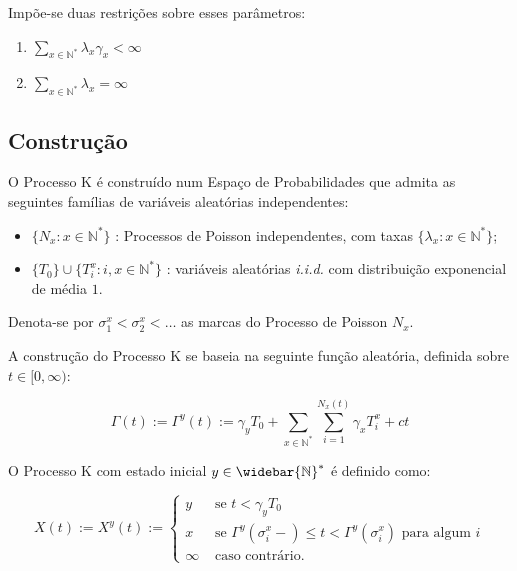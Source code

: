 \documentclass[xcolor=pdftex,dvipsnames]{beamer}
\newcommand{\Nz}{{\mathbb{N^*}}}
\newcommand{\Nzb}{{\mathbb{\widebar{N}^*}}}
\begin{document}
\begin{frame}

  Impõe-se duas restrições sobre esses parâmetros:
  \begin{block}{}
    \begin{enumerate}
    \item $ \displaystyle \sum_{x\in \Nz} \lambda_x \gamma_x <
      \infty $
      \bigskip
    \item $ \displaystyle \sum_{x\in \Nz} \lambda_x = \infty $
    \end{enumerate}
  \end{block}
\end{frame}

\subsection{Construção}

\begin{frame}

  O Processo K é construído num Espaço de Probabilidades que admita as
  seguintes famílias de variáveis aleatórias independentes:

  \begin{itemize}
  \item $\{ N_x: x \in \Nz\}$ : Processos de Poisson independentes,
    com taxas $\{ \lambda_x : x \in \Nz \}$;
  \item $\{T_0\} \cup \{ T_i^x: i, x \in \Nz  \}$ : variáveis aleatórias
    \emph{i.i.d.} com distribuição exponencial de média $1$.
  \end{itemize}

  Denota-se por $\sigma^x_1 < \sigma^x_2 < \ldots$ as marcas do
  Processo de Poisson $N_x$.
  
\end{frame}

\begin{frame}

  A construção do Processo K se baseia na seguinte função aleatória,
  definida sobre $t \in [0, \infty)$:

  \begin{displaymath}
    \Gamma(t) := \Gamma^y(t) :=
    \gamma_y T_0 + \sum_{x \in \Nz} \sum_{i = 1}^{N_x (t)} \gamma_x T^x_i + c t
  \end{displaymath}
\end{frame}

\begin{frame}
  
  O Processo K com estado inicial $y \in \Nzb$ é definido como:

  \begin{displaymath}
    X(t) := X^y (t) :=
    \begin{cases}
      y & \textrm{ se }  t < \gamma_y T_0\\
      x & \textrm{ se } \Gamma^y(\sigma_i^x-) \leq t <
      \Gamma^y(\sigma^x_i)
      \textrm{ para algum } i \\
      \infty & \textrm{ caso contrário.}
    \end{cases}
  \end{displaymath}
\end{frame}
\end{document}
